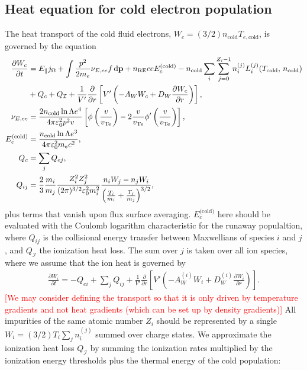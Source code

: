 \documentclass[11pt,a4paper]{article}
\newcommand{\rd}{\ensuremath{\mathrm{d}}}
\newcommand{\sub}[1]{\ensuremath{_{\text{#1}}}}
\renewcommand{\b}[1]{\ensuremath{ {\bf #1 } }}
\begin{document}
\subsection{Heat equation for cold electron population}
The heat transport of the cold fluid electrons, $W_c = (3/2)n\sub{cold}T_{e,\text{cold}}$, is governed by the equation
\begin{align}
\frac{\partial W_c}{\partial t} &= E_\parallel j_\Omega + \int  \frac{p^2}{2m_e}\nu_{E,ee} f \,\rd \b{p}  + n\sub{RE} ceE_c^\text{(cold)} -n\sub{cold} \sum_i \sum_{j=0}^{Z_i-1} n_i^{(j)} L_{i}^{(j)}(T\sub{cold},\,n\sub{cold})  \nonumber \\
&+ Q_c +Q_\mathcal{I} +  \frac{1}{V'}\frac{\partial}{\partial r}\left[V'\left(-A_W W_c + D_W\frac{\partial W_c}{\partial r}\right)\right], \nonumber \\
\nu_{E,ee} &= \frac{2 n\sub{cold}\ln\Lambda e^4}{4\pi\varepsilon_0^2 p^2 v} \left[\phi\left(\frac{v}{v\sub{Te}}\right) - 2\frac{v}{v\sub{Te}}\phi'\left(\frac{v}{v\sub{Te}}\right)\right], \nonumber \\
E_c^\text{(cold)} &= \frac{n\sub{cold}\ln\Lambda e^3}{4\pi\varepsilon_0^2 m_e c^2}, \nonumber \\
Q_c &= \sum_j Q_{ej}, \nonumber\\
Q_{ij} &= \frac{2}{3}\frac{m_i}{m_j} \frac{Z_i^2 Z_j^2}{(2\pi)^{3/2}\varepsilon_0^2 m_i^2}\frac{n_iW_j-n_jW_i}{\left(\frac{T_i}{m_i}+\frac{T_j}{m_j}\right)^{3/2}},
\end{align}
plus terms that vanish upon flux surface averaging. $E_c^\text{(cold)}$ here should be evaluated with the Coulomb logarithm characteristic for the runaway populaltion, where $Q_{ij}$ is the collisional energy transfer between Maxwellians of species $i$ and $j$, and $Q_\mathcal{I}$ the ionization heat loss. The sum over $j$ is taken over all ion species, where we assume that the ion heat is governed by 
\begin{align}
\frac{\partial W_i}{\partial t} = -Q_{ei} + \sum_j Q_{ij} +\frac{1}{V'}\frac{\partial}{\partial r}\left[V'\left(-A_W^{(i)} W_i + D_W^{(i)}\frac{\partial W_i}{\partial r}\right)\right].
\end{align}
\textcolor{red}{[We may consider defining the transport so that it is only driven by temperature gradients and not heat gradients (which can be set up by density gradients)]} All impurities of the same atomic number $Z_i$ should be represented by a single $W_i = (3/2)T_i \sum_j n_i^{(j)}$ summed over charge states. We approximate the ionization heat loss $Q_\mathcal{I}$ by summing the ionization rates multiplied by the ionization energy thresholds plus the thermal energy of the cold population:
\end{document}
